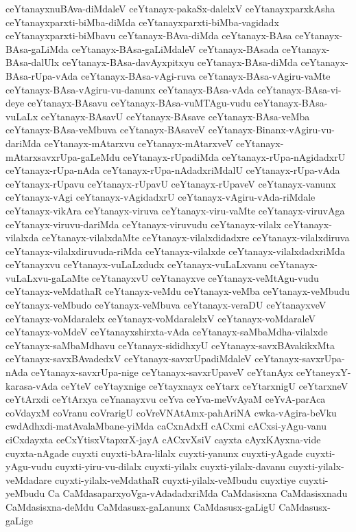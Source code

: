 {ceYtanayxnuBAva-diMdaleV
ceYtanayx-pakaSx-dalelxV
ceYtanayxparxkAsha
ceYtanayxparxti-biMba-diMda
ceYtanayxparxti-biMba-vagidadx
ceYtanayxparxti-biMbavu
ceYtanayx-BAva-diMda
ceYtanayx-BAsa
ceYtanayx-BAsa-gaLiMda
ceYtanayx-BAsa-gaLiMdaleV
ceYtanayx-BAsada
ceYtanayx-BAsa-dalUlx
ceYtanayx-BAsa-davAyxpitxyu
ceYtanayx-BAsa-diMda
ceYtanayx-BAsa-rUpa-vAda
ceYtanayx-BAsa-vAgi-ruva
ceYtanayx-BAsa-vAgiru-vaMte
ceYtanayx-BAsa-vAgiru-vu-danunx
ceYtanayx-BAsa-vAda
ceYtanayx-BAsa-vi-deye
ceYtanayx-BAsavu
ceYtanayx-BAsa-vuMTAgu-vudu
ceYtanayx-BAsa-vuLaLx
ceYtanayx-BAsavU
ceYtanayx-BAsave
ceYtanayx-BAsa-veMba
ceYtanayx-BAsa-veMbuva
ceYtanayx-BAsaveV
ceYtanayx-Binanx-vAgiru-vu-dariMda
ceYtanayx-mAtarxvu
ceYtanayx-mAtarxveV
ceYtanayx-mAtarxsavxrUpa-gaLeMdu
ceYtanayx-rUpadiMda
ceYtanayx-rUpa-nAgidadxrU
ceYtanayx-rUpa-nAda
ceYtanayx-rUpa-nAdadxriMdalU
ceYtanayx-rUpa-vAda
ceYtanayx-rUpavu
ceYtanayx-rUpavU
ceYtanayx-rUpaveV
ceYtanayx-vanunx
ceYtanayx-vAgi
ceYtanayx-vAgidadxrU
ceYtanayx-vAgiru-vAda-riMdale
ceYtanayx-vikAra
ceYtanayx-viruva
ceYtanayx-viru-vaMte
ceYtanayx-viruvAga
ceYtanayx-viruvu-dariMda
ceYtanayx-viruvudu
ceYtanayx-vilalx
ceYtanayx-vilalxda
ceYtanayx-vilalxdaMte
ceYtanayx-vilalxdidadxre
ceYtanayx-vilalxdiruva
ceYtanayx-vilalxdiruvuda-riMda
ceYtanayx-vilalxde
ceYtanayx-vilalxdadxriMda
ceYtanayxvu
ceYtanayx-vuLaLxdudx
ceYtanayx-vuLaLxvanu
ceYtanayx-vuLaLxvu-gaLaMte
ceYtanayxvU
ceYtanayxve
ceYtanayx-veMtAgu-vudu
ceYtanayx-veMdathaR
ceYtanayx-veMdu
ceYtanayx-veMba
ceYtanayx-veMbudu
ceYtanayx-veMbudo
ceYtanayx-veMbuva
ceYtanayx-veraDU
ceYtanayxveV
ceYtanayx-voMdaralelx
ceYtanayx-voMdaralelxV
ceYtanayx-voMdaraleV
ceYtanayx-voMdeV
ceYtanayxshirxta-vAda
ceYtanayx-saMbaMdha-vilalxde
ceYtanayx-saMbaMdhavu
ceYtanayx-sididhxyU
ceYtanayx-savxBAvakikxMta
ceYtanayx-savxBAvadedxV
ceYtanayx-savxrUpadiMdaleV
ceYtanayx-savxrUpa-nAda
ceYtanayx-savxrUpa-nige
ceYtanayx-savxrUpaveV
ceYtanAyx
ceYtaneyxY-karasa-vAda
ceYteV
ceYtayxnige
ceYtayxnayx
ceYtarx
ceYtarxnigU
ceYtarxneV
ceYtArxdi
ceYtArxya
ceYnanayxvu
ceYva
ceYva-meVvAyaM
ceYvA-parAca
coVdayxM
coVranu
coVrarigU
coVreVNAtAmx-pahAriNA
cwka-vAgira-beVku
cwdAdhxdi-matAvalaMbane-yiMda
caCxnAdxH
cACxmi
cACxsi-yAgu-vanu
ciCxdayxta
ceCxYtisxVtapxrX-jayA
cACxvXsiV
cayxta
cAyxKAyxna-vide
cuyxta-nAgade
cuyxti
cuyxti-bAra-lilalx
cuyxti-yanunx
cuyxti-yAgade
cuyxti-yAgu-vudu
cuyxti-yiru-vu-dilalx
cuyxti-yilalx
cuyxti-yilalx-davanu
cuyxti-yilalx-veMdadare
cuyxti-yilalx-veMdathaR
cuyxti-yilalx-veMbudu
cuyxtiye
cuyxti-yeMbudu
Ca
CaMdasaparxyoVga-vAdadadxriMda
CaMdasisxna
CaMdasisxnadu
CaMdasisxna-deMdu
CaMdasusx-gaLanunx
CaMdasusx-gaLigU
CaMdasusx-gaLige
}
